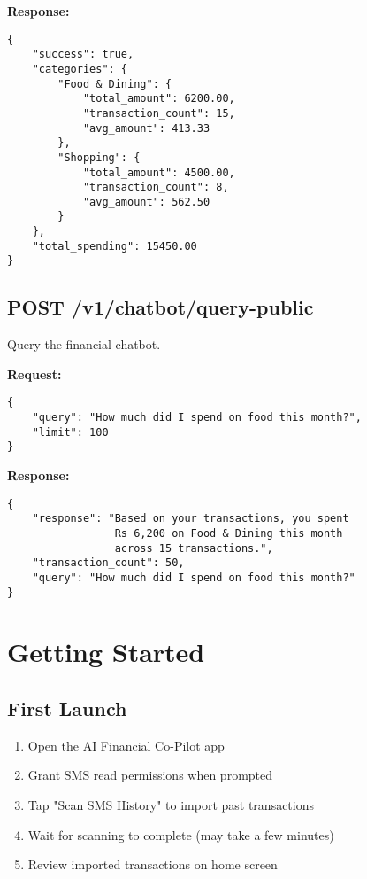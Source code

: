 \documentclass[11pt,a4paper]{report}
\begin{document}
\begin{itemize}
\textbf{Response:}
\begin{lstlisting}[]
{
    "success": true,
    "categories": {
        "Food & Dining": {
            "total_amount": 6200.00,
            "transaction_count": 15,
            "avg_amount": 413.33
        },
        "Shopping": {
            "total_amount": 4500.00,
            "transaction_count": 8,
            "avg_amount": 562.50
        }
    },
    "total_spending": 15450.00
}
\end{lstlisting}


\subsection{POST /v1/chatbot/query-public}
Query the financial chatbot.

\textbf{Request:}
\begin{lstlisting}[]
{
    "query": "How much did I spend on food this month?",
    "limit": 100
}
\end{lstlisting}

\textbf{Response:}
\begin{lstlisting}[]
{
    "response": "Based on your transactions, you spent 
                 Rs 6,200 on Food & Dining this month 
                 across 15 transactions.",
    "transaction_count": 50,
    "query": "How much did I spend on food this month?"
}
\end{lstlisting}


\section{Getting Started}

\subsection{First Launch}
\begin{enumerate}
    \item Open the AI Financial Co-Pilot app
    \item Grant SMS read permissions when prompted
    \item Tap "Scan SMS History" to import past transactions
    \item Wait for scanning to complete (may take a few minutes)
    \item Review imported transactions on home screen
\end{enumerate}


\end{itemize}
\end{document}
